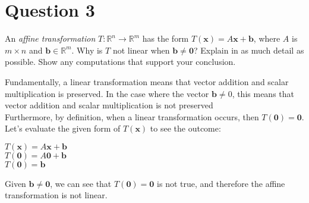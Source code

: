 \documentclass{report}
\begin{document}
\section*{Question 3}
\begin{example}
    An {\it affine transformation} $T : \mathbb{R}^n \rightarrow \mathbb{R}^m$ has the form $T(\mathbf{x}) = A\mathbf{x} + \mathbf{b}$, where $A$ is $m \times n$ and $\mathbf{b} \in \mathbb{R}^m$. Why is $T$ not linear when $\mathbf{b} \ne \mathbf{0}$? Explain in as much detail as possible. Show any computations that support your conclusion.
\end{example}

Fundamentally, a linear transformation means that vector addition and scalar multiplication is preserved. In the case where the vector $\mathbf{b}\neq 0$, this means that vector addition and scalar multiplication is not preserved\\

Furthermore, by definition, when a linear transformation occurs, then $T(\mathbf{0}) = \mathbf{0}$. Let's evaluate the given form of $T(\mathbf{x})$ to see the outcome:
\begin{center}
$T(\mathbf{x}) = A\mathbf{x} + \mathbf{b}$\\
$T(\mathbf{0}) = A\mathbf{0} + \mathbf{b}$\\
$T(\mathbf{0}) = \mathbf{b}$
\end{center}

Given $\mathbf{b} \ne \mathbf{0}$, we can see that $T(\mathbf{0}) = \mathbf{0}$ is not true, and therefore the affine transformation is not linear.
\clearpage
\end{document}
